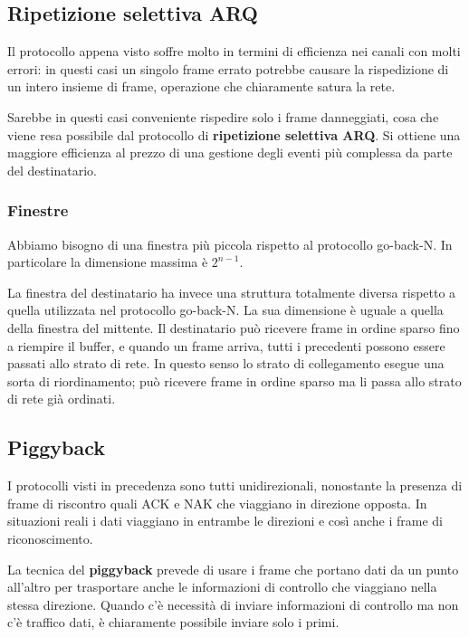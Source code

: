     \subsection{Ripetizione selettiva ARQ}
        Il protocollo appena visto soffre molto in termini di efficienza nei canali con molti errori: in questi casi un singolo frame errato potrebbe causare la rispedizione di un intero insieme di frame, operazione che chiaramente satura la rete.
        
        Sarebbe in questi casi conveniente rispedire solo i frame danneggiati, cosa che viene resa possibile dal protocollo di \textbf{ripetizione selettiva ARQ}. Si ottiene una maggiore efficienza al prezzo di una gestione degli eventi più complessa da parte del destinatario.
        
        \subsubsection{Finestre}
            Abbiamo bisogno di una finestra più piccola rispetto al protocollo go-back-N. In particolare la dimensione massima è $2^{n-1}$. 
            
            La finestra del destinatario ha invece una struttura totalmente diversa rispetto a quella utilizzata nel protocollo go-back-N. La sua dimensione è uguale a quella della finestra del mittente. Il destinatario può ricevere frame in ordine sparso fino a riempire il buffer, e quando un frame arriva, tutti i precedenti possono essere passati allo strato di rete. In questo senso lo strato di collegamento esegue una sorta di riordinamento; può ricevere frame in ordine sparso ma li passa allo strato di rete già ordinati.
    
    \subsection{Piggyback}
        I protocolli visti in precedenza sono tutti unidirezionali, nonostante la presenza di frame di riscontro quali ACK e NAK che viaggiano in direzione opposta. In situazioni reali i dati viaggiano in entrambe le direzioni e così anche i frame di riconoscimento.
        
        La tecnica del \textbf{piggyback} prevede di usare i frame che portano dati da un punto all'altro per trasportare anche le informazioni di controllo che viaggiano nella stessa direzione. Quando c'è necessità di inviare informazioni di controllo ma non c'è traffico dati, è chiaramente possibile inviare solo i primi.
        
